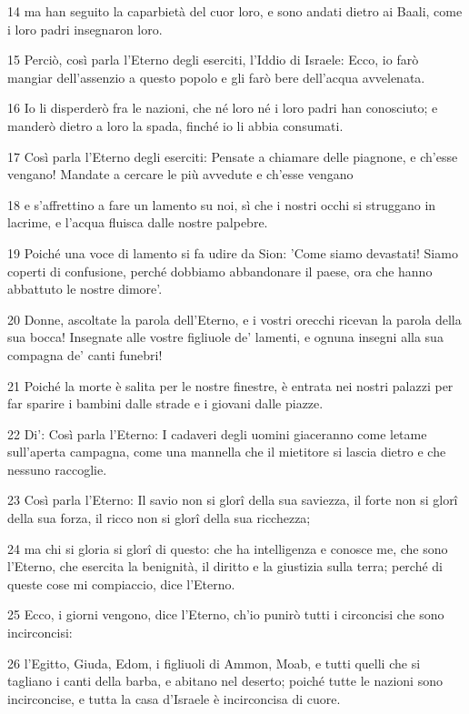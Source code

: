 \par 14 ma han seguito la caparbietà del cuor loro, e sono andati dietro ai Baali, come i loro padri insegnaron loro.
\par 15 Perciò, così parla l'Eterno degli eserciti, l'Iddio di Israele: Ecco, io farò mangiar dell'assenzio a questo popolo e gli farò bere dell'acqua avvelenata.
\par 16 Io li disperderò fra le nazioni, che né loro né i loro padri han conosciuto; e manderò dietro a loro la spada, finché io li abbia consumati.
\par 17 Così parla l'Eterno degli eserciti: Pensate a chiamare delle piagnone, e ch'esse vengano! Mandate a cercare le più avvedute e ch'esse vengano
\par 18 e s'affrettino a fare un lamento su noi, sì che i nostri occhi si struggano in lacrime, e l'acqua fluisca dalle nostre palpebre.
\par 19 Poiché una voce di lamento si fa udire da Sion: 'Come siamo devastati! Siamo coperti di confusione, perché dobbiamo abbandonare il paese, ora che hanno abbattuto le nostre dimore'.
\par 20 Donne, ascoltate la parola dell'Eterno, e i vostri orecchi ricevan la parola della sua bocca! Insegnate alle vostre figliuole de' lamenti, e ognuna insegni alla sua compagna de' canti funebri!
\par 21 Poiché la morte è salita per le nostre finestre, è entrata nei nostri palazzi per far sparire i bambini dalle strade e i giovani dalle piazze.
\par 22 Di': Così parla l'Eterno: I cadaveri degli uomini giaceranno come letame sull'aperta campagna, come una mannella che il mietitore si lascia dietro e che nessuno raccoglie.
\par 23 Così parla l'Eterno: Il savio non si glorî della sua saviezza, il forte non si glorî della sua forza, il ricco non si glorî della sua ricchezza;
\par 24 ma chi si gloria si glorî di questo: che ha intelligenza e conosce me, che sono l'Eterno, che esercita la benignità, il diritto e la giustizia sulla terra; perché di queste cose mi compiaccio, dice l'Eterno.
\par 25 Ecco, i giorni vengono, dice l'Eterno, ch'io punirò tutti i circoncisi che sono incirconcisi:
\par 26 l'Egitto, Giuda, Edom, i figliuoli di Ammon, Moab, e tutti quelli che si tagliano i canti della barba, e abitano nel deserto; poiché tutte le nazioni sono incirconcise, e tutta la casa d'Israele è incirconcisa di cuore.

